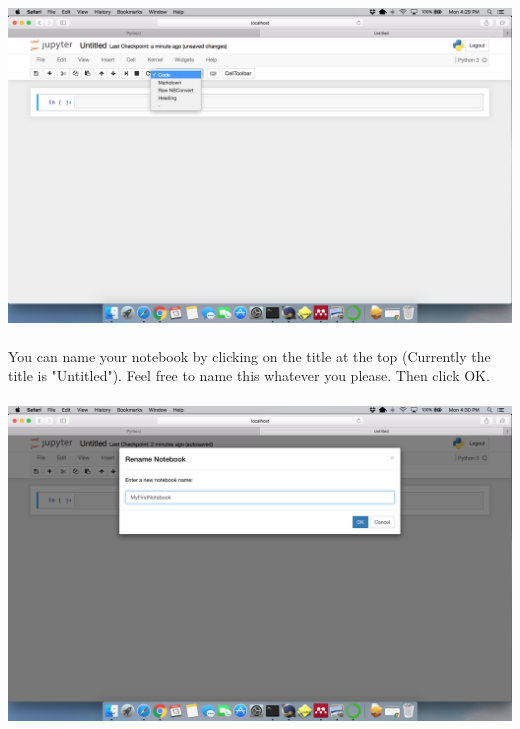 \documentclass[]{article}
\begin{document}
\paragraph{}
\begin{centering}
    \centerline{\includegraphics[scale=0.35]{Screenshot_21.png}}
\end{centering}

\paragraph{}
You can name your notebook by clicking on the title at the top (Currently the title is "Untitled"). Feel free to name this whatever you please. Then click OK.
\paragraph{}
\begin{centering}
    \centerline{\includegraphics[scale=0.35]{Screenshot_22.png}}
\end{centering}
\end{document}
